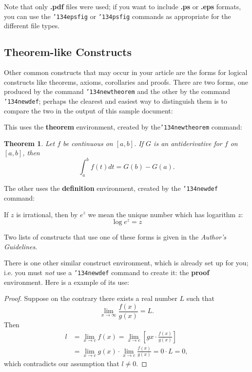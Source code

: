\documentclass{vldb}
\begin{document}
Note that only {\textbf{.pdf}} files were used; if you want to include
{\textbf{.ps}} or {\textbf{.eps}} formats, you can use the
\texttt{{\char'134}epsfig} or \texttt{{\char'134}psfig}
commands as appropriate for the different file types.

\subsection{Theorem-like Constructs}
Other common constructs that may occur in your article are
the forms for logical constructs like theorems, axioms,
corollaries and proofs.  There are
two forms, one produced by the
command \texttt{{\char'134}newtheorem} and the
other by the command \texttt{{\char'134}newdef}; perhaps
the clearest and easiest way to distinguish them is
to compare the two in the output of this sample document:

This uses the \textbf{theorem} environment, created by
the\linebreak\texttt{{\char'134}newtheorem} command:
\newtheorem{theorem}{Theorem}
\begin{theorem}
Let $f$ be continuous on $[a,b]$.  If $G$ is
an antiderivative for $f$ on $[a,b]$, then
\begin{displaymath}\int^b_af(t)dt = G(b) - G(a).\end{displaymath}
\end{theorem}

The other uses the \textbf{definition} environment, created
by the \texttt{{\char'134}newdef} command:
\begin{definition}
If $z$ is irrational, then by $e^z$ we mean the
unique number which has
logarithm $z$: \begin{displaymath}{\log e^z = z}\end{displaymath}
\end{definition}

Two lists of constructs that use one of these
forms is given in the
\textit{Author's  Guidelines}.


There is one other similar construct environment, which is
already set up
for you; i.e. you must \textit{not} use
a \texttt{{\char'134}newdef} command to
create it: the \textbf{proof} environment.  Here
is a example of its use:
\begin{proof}
Suppose on the contrary there exists a real number $L$ such that
\begin{displaymath}
\lim_{x\rightarrow\infty} \frac{f(x)}{g(x)} = L.
\end{displaymath}
Then
\begin{align*}
l&=\lim_{x\rightarrow c} f(x)
= \lim_{x\rightarrow c}
\left[ g{x} \cdot \frac{f(x)}{g(x)} \right ] \\
&= \lim_{x\rightarrow c} g(x) \cdot \lim_{x\rightarrow c}
\frac{f(x)}{g(x)} = 0\cdot L = 0,
\end{align*}
which contradicts our assumption that $l\neq 0$.
\end{proof}
\end{document}
